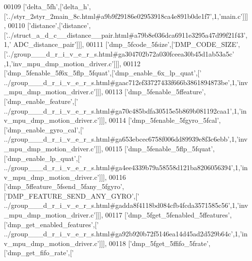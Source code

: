 \begin{DoxyCode}
00109   [\textcolor{stringliteral}{'delta\_5fh'},[\textcolor{stringliteral}{'delta\_h'},[\textcolor{stringliteral}{'../styr\_2styr\_2main\_8c.html#a9b9f29186e02953918ca4e891b0de1f7'},1,\textcolor{stringliteral}{'main.c'}]]],
00110   [\textcolor{stringliteral}{'distance'},[\textcolor{stringliteral}{'distance'},[\textcolor{stringliteral}{'../struct\_a\_d\_c\_\_distance\_\_pair.html#a79b8e036dca6911e3295a47d99f21f43'},1,\textcolor{stringliteral}{'
      ADC\_distance\_pair'}]]],
00111   [\textcolor{stringliteral}{'dmp\_5fcode\_5fsize'},[\textcolor{stringliteral}{'DMP\_CODE\_SIZE'},[\textcolor{stringliteral}{'../group\_\_\_d\_r\_i\_v\_e\_r\_s.html#ga304702b72a030fceea30b45d1ab53a5c'}
      ,1,\textcolor{stringliteral}{'inv\_mpu\_dmp\_motion\_driver.c'}]]],
00112   [\textcolor{stringliteral}{'dmp\_5fenable\_5f6x\_5flp\_5fquat'},[\textcolor{stringliteral}{'dmp\_enable\_6x\_lp\_quat'},[\textcolor{stringliteral}{'
      ../group\_\_\_d\_r\_i\_v\_e\_r\_s.html#gaac712ef33727433f666b3861894873be'},1,\textcolor{stringliteral}{'inv\_mpu\_dmp\_motion\_driver.c'}]]],
00113   [\textcolor{stringliteral}{'dmp\_5fenable\_5ffeature'},[\textcolor{stringliteral}{'dmp\_enable\_feature'},[\textcolor{stringliteral}{'
      ../group\_\_\_d\_r\_i\_v\_e\_r\_s.html#ga70c485bdfa30515e5b869b081192caa1'},1,\textcolor{stringliteral}{'inv\_mpu\_dmp\_motion\_driver.c'}]]],
00114   [\textcolor{stringliteral}{'dmp\_5fenable\_5fgyro\_5fcal'},[\textcolor{stringliteral}{'dmp\_enable\_gyro\_cal'},[\textcolor{stringliteral}{'
      ../group\_\_\_d\_r\_i\_v\_e\_r\_s.html#ga653ebcec6758f006dd89939e8f3c6ebb'},1,\textcolor{stringliteral}{'inv\_mpu\_dmp\_motion\_driver.c'}]]],
00115   [\textcolor{stringliteral}{'dmp\_5fenable\_5flp\_5fquat'},[\textcolor{stringliteral}{'dmp\_enable\_lp\_quat'},[\textcolor{stringliteral}{'
      ../group\_\_\_d\_r\_i\_v\_e\_r\_s.html#ga4ee4339b79a58558d121ba8206056394'},1,\textcolor{stringliteral}{'inv\_mpu\_dmp\_motion\_driver.c'}]]],
00116   [\textcolor{stringliteral}{'dmp\_5ffeature\_5fsend\_5fany\_5fgyro'},[\textcolor{stringliteral}{'DMP\_FEATURE\_SEND\_ANY\_GYRO'},[\textcolor{stringliteral}{'
      ../group\_\_\_d\_r\_i\_v\_e\_r\_s.html#gadda8f4118bd084cfb4fcda3571585c56'},1,\textcolor{stringliteral}{'inv\_mpu\_dmp\_motion\_driver.c'}]]],
00117   [\textcolor{stringliteral}{'dmp\_5fget\_5fenabled\_5ffeatures'},[\textcolor{stringliteral}{'dmp\_get\_enabled\_features'},[\textcolor{stringliteral}{'
      ../group\_\_\_d\_r\_i\_v\_e\_r\_s.html#ga92b920b72f5146ea14d45ad2d529b64c'},1,\textcolor{stringliteral}{'inv\_mpu\_dmp\_motion\_driver.c'}]]],
00118   [\textcolor{stringliteral}{'dmp\_5fget\_5ffifo\_5frate'},[\textcolor{stringliteral}{'dmp\_get\_fifo\_rate'},[\textcolor{stringliteral}{'
}
\end{DoxyCode}
